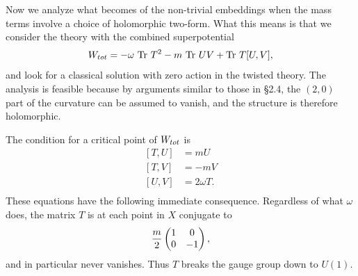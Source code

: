 \documentclass[12pt]{article}
\numberwithin{equation}{section}
\DeclareMathOperator{\Tr}{Tr}
\begin{document}
\bigskip
{}

Now we analyze what becomes of the non-trivial embeddings when
the mass terms involve a choice of holomorphic two-form.
What this means is that we consider the theory with the combined
superpotential
\begin{equation}
  \label{son}
  W_{\mit tot}=-\omega \,\Tr\, T^2- m\,\Tr\, UV +\Tr\, T[U,V],
\end{equation}
and look for a classical solution with zero action in the twisted theory.
The analysis is feasible because by arguments similar to those in
\S2.4, the $(2,0)$ part of the curvature can be assumed to vanish,
and the structure is therefore holomorphic.

The condition for a critical point of $W_{\mit tot}$ is
\begin{equation}
  \label{condcrit}
  \begin{aligned}
    [T,U] & = mU\\ [T,V] & = -mV\\ [U,V] & = 2\omega T.\\
  \end{aligned}
\end{equation}
These equations have the following immediate consequence.  Regardless
of what $\omega$ does, the matrix $T$ is at each point in $X$ conjugate
to
\begin{equation}
  \label{ondcrit}
  {m\over 2}
  \begin{pmatrix} 1 & 0 \\ 0 & -1\\
  \end{pmatrix},
\end{equation}
and in particular never vanishes.  Thus $T$ breaks the gauge
group down to $U(1)$.
\end{document}
